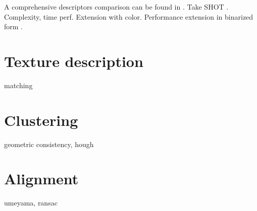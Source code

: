 
A comprehensive descriptors comparison can be found in \cite{descriptorsComparison}.
Take SHOT \cite{SHOT}. Complexity, time perf. Extension with color. \cite{CSHOT} Performance extension in binarized form \cite{BSHOT}.


\section{Texture description} %
\label{sec:colour} %

matching \cite{ORB}


\section{Clustering}
\label{sec:clustering}

geometric consistency, hough


\section{Alignment}
\label{sec:alignment}

umeyama, ransac

